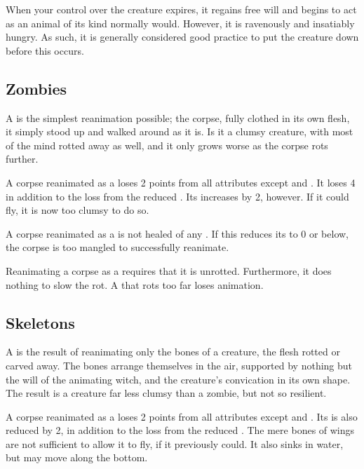 When your control over the creature expires, it regains free will and begins to act as an animal of its kind normally would.
However, it is ravenously and insatiably hungry.
As such, it is generally considered good practice to put the creature down before this occurs.

\subsection{Zombies}

A  is the simplest reanimation possible; the corpse, fully clothed in its own flesh, it simply stood up and walked around as it is.
Is it a clumsy creature, with most of the mind rotted away as well, and it only grows worse as the corpse rots further.

A corpse reanimated as a  loses 2 points from all attributes except  and .
It loses 4  in addition to the loss from the reduced .
Its  increases by 2, however.
If it could fly, it is now too clumsy to do so.

A corpse reanimated as a  is not healed of any {\damage}.
If this reduces its  to 0 or below, the corpse is too mangled to successfully reanimate.

Reanimating a corpse as a  requires that it is unrotted.
Furthermore, it does nothing to slow the rot.
A  that rots too far loses animation.

\subsection{Skeletons}

A  is the result of reanimating only the bones of a creature, the flesh rotted or carved away.
The bones arrange themselves in the air, supported by nothing but the will of the animating witch, and the creature's convication in its own shape.
The result is a creature far less clumsy than a zombie, but not so resilient.

A corpse reanimated as a  loses 2 points from all attributes except  and .
Its  is also reduced by 2, in addition to the loss from the reduced .
The mere bones of wings are not sufficient to allow it to fly, if it previously could.
It also sinks in water, but may move along the bottom.

